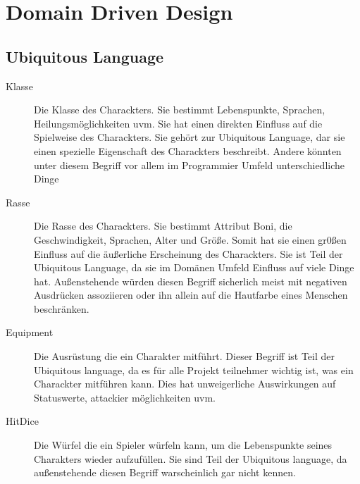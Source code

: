 \chapter{Domain Driven Design}
\section{Ubiquitous Language}
\begin{description}
	\item[Klasse] Die Klasse des Charackters. Sie bestimmt Lebenspunkte, Sprachen, Heilungsmöglichkeiten uvm. Sie hat einen direkten Einfluss auf die Spielweise des Charackters. Sie gehört zur Ubiquitous Language, dar sie einen spezielle Eigenschaft des Charackters beschreibt. Andere könnten unter diesem Begriff vor allem im Programmier Umfeld unterschiedliche Dinge
	\item[Rasse] Die Rasse des Charackters. Sie bestimmt Attribut Boni, die Geschwindigkeit, Sprachen, Alter und Größe. Somit hat sie einen gr0ßen Einfluss auf die äußerliche Erscheinung des Charackters. Sie ist Teil der Ubiquitous Language, da sie im Domänen Umfeld Einfluss auf viele Dinge hat. Außenstehende würden diesen Begriff sicherlich meist mit negativen Ausdrücken assoziieren oder ihn allein auf die Hautfarbe eines Menschen beschränken.
	\item[Equipment] Die Ausrüstung die ein Charakter mitführt. Dieser Begriff ist Teil der Ubiquitous language, da es für alle Projekt teilnehmer wichtig ist, was ein Charackter mitführen kann. Dies hat unweigerliche Auswirkungen auf Statuswerte, attackier möglichkeiten uvm.
	\item[HitDice] Die Würfel die ein Spieler würfeln kann, um die Lebenspunkte seines Charakters wieder aufzufüllen. Sie sind Teil der Ubiquitous language, da außenstehende diesen Begriff warscheinlich gar nicht kennen.
\end{description}

\FloatBarrier
